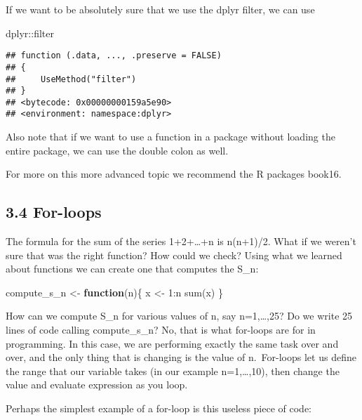\documentclass[
]{article}
\newenvironment{Shaded}{\begin{snugshade}}{\end{snugshade}}
\newcommand{\ControlFlowTok}[1]{\textcolor[rgb]{0.13,0.29,0.53}{\textbf{#1}}}
\newcommand{\DecValTok}[1]{\textcolor[rgb]{0.00,0.00,0.81}{#1}}
\newcommand{\FunctionTok}[1]{\textcolor[rgb]{0.00,0.00,0.00}{#1}}
\newcommand{\NormalTok}[1]{#1}
\newcommand{\OtherTok}[1]{\textcolor[rgb]{0.56,0.35,0.01}{#1}}
\newcommand{\SpecialCharTok}[1]{\textcolor[rgb]{0.00,0.00,0.00}{#1}}
\begin{document}
If we want to be absolutely sure that we use the dplyr filter, we can
use

\begin{Shaded}
\begin{Highlighting}[]
\NormalTok{dplyr}\SpecialCharTok{::}\NormalTok{filter}
\end{Highlighting}
\end{Shaded}

\begin{verbatim}
## function (.data, ..., .preserve = FALSE) 
## {
##     UseMethod("filter")
## }
## <bytecode: 0x00000000159a5e90>
## <environment: namespace:dplyr>
\end{verbatim}

Also note that if we want to use a function in a package without loading
the entire package, we can use the double colon as well.

For more on this more advanced topic we recommend the R packages book16.

\hypertarget{for-loops}{%
\subsection{3.4 For-loops}\label{for-loops}}

The formula for the sum of the series 1+2+\ldots+n is n(n+1)/2. What if
we weren't sure that was the right function? How could we check? Using
what we learned about functions we can create one that computes the
S\_n:

\begin{Shaded}
\begin{Highlighting}[]
\NormalTok{compute\_s\_n }\OtherTok{\textless{}{-}} \ControlFlowTok{function}\NormalTok{(n)\{}
\NormalTok{  x }\OtherTok{\textless{}{-}} \DecValTok{1}\SpecialCharTok{:}\NormalTok{n}
  \FunctionTok{sum}\NormalTok{(x)}
\NormalTok{\}}
\end{Highlighting}
\end{Shaded}

How can we compute S\_n for various values of n, say n=1,\ldots,25? Do
we write 25 lines of code calling compute\_s\_n? No, that is what
for-loops are for in programming. In this case, we are performing
exactly the same task over and over, and the only thing that is changing
is the value of n.~For-loops let us define the range that our variable
takes (in our example n=1,\ldots,10), then change the value and evaluate
expression as you loop.

Perhaps the simplest example of a for-loop is this useless piece of
code:
\end{document}
